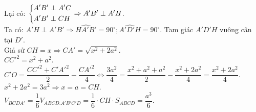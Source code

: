 \begin{ex}
{		Lại có: $\left\{\begin{aligned}&A'B'\perp A'C\\&A'B'\perp CH\end{aligned}\right.\Rightarrow A'B'\perp A'H$.\\
		Ta có: $A'H\perp A'B'\Rightarrow\widehat{HA'B'}=90^{\circ};\widehat{A'D'H}=90^{\circ}$. Tam giác $A'D'H$ vuông cân tại $D'$.\\
		Giả sử $CH=x\Rightarrow CA'=\sqrt{x^2+2a^2}$.\\
		$CC'^2=x^2+a^2$.\\
		$C'O=\dfrac{CC'^2+C'A'^2}{2}-\dfrac{CA'^2}{4}\Leftrightarrow\dfrac{3a^2}{4}=\dfrac{x^2+a^2+a^2}{2}-\dfrac{x^2+2a^2}{4}=\dfrac{x^2+2a^2}{4}$.\\
		$x^2+2a^2=3a^2\Rightarrow x=a=CH$.\\
		$V_{BCDA'}=\dfrac{1}{6}V_{ABCD.A'B'C'D}=\dfrac{1}{6}\cdot CH\cdot S_{ABCD}=\dfrac{a^3}{6}$.}
\end{ex}
